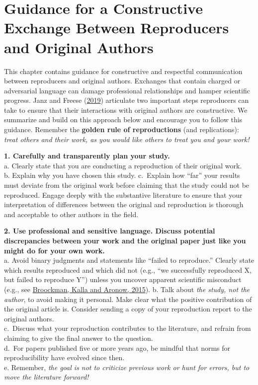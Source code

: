 \documentclass[
]{book}
\begin{document}
\hypertarget{guidance-for-a-constructive-exchange-between-reproducers-and-original-authors}{%
\chapter{Guidance for a Constructive Exchange Between Reproducers and Original Authors}\label{guidance-for-a-constructive-exchange-between-reproducers-and-original-authors}}

This chapter contains guidance for constructive and respectful communication between reproducers and original authors. Exchanges that contain charged or adversarial language can damage professional relationships and hamper scientific progress. Janz and Freese (\href{https://www.mzes.uni-mannheim.de/openscience/wp-content/uploads/2019/01/Janz-Freese_-Good-and-Bad-Replications-1.pdf}{2019}) articulate two important steps reproducers can take to ensure that their interactions with original authors are constructive. We summarize and build on this approach below and encourage you to follow this guidance. Remember the \textbf{golden rule of reproductions} (and replications): \emph{treat others and their work, as you would like others to treat you and your work!}

\textbf{1. Carefully and transparently plan your study.}\\
a. Clearly state that you are conducting a reproduction of their original work.\\
b. Explain why you have chosen this study.
c.~Explain how ``far'' your results must deviate from the original work before claiming that the study could not be reproduced. Engage deeply with the substantive literature to ensure that your interpretation of differences between the original and reproduction is thorough and acceptable to other authors in the field.

\textbf{2. Use professional and sensitive language. Discuss potential discrepancies between your work and the original paper just like you might do for your own work.}\\
a. Avoid binary judgments and statements like ``failed to reproduce.'' Clearly state which results reproduced and which did not (e.g., ``we successfully reproduced X, but failed to reproduce Y'') unless you uncover apparent scientific misconduct (e.g., see \href{https://doi.org/10.31222/osf.io/qy2se}{Broockman, Kalla and Aronow, 2015}).
b. Talk about \emph{the study, not the author}, to avoid making it personal. Make clear what the positive contribution of the original article is. Consider sending a copy of your reproduction report to the original authors.\\
c.~Discuss what your reproduction contributes to the literature, and refrain from claiming to give the final answer to the question.\\
d.~For papers published five or more years ago, be mindful that norms for reproducibility have evolved since then.\\
e. Remember, \emph{the goal is not to criticize previous work or hunt for errors, but to move the literature forward!}
\end{document}
